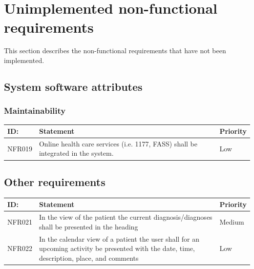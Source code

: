 \documentclass{scrreprt}
\begin{document}
\section{Unimplemented non-functional requirements}
This section describes the non-functional requirements that have not been implemented. 


\subsection{System software attributes}

\subsubsection{Maintainability}
\begin{center}
\begin{tabularx}{\linewidth}{| l | X | l |}
\hline
\textbf{ID:} & \textbf{Statement} & \textbf{Priority} \\
\hline
NFR019 & 
Online health care services (i.e. 1177, FASS) shall be integrated in the system. & 
Low \\ 
\hline
\end{tabularx}
\end{center}


\subsection{Other requirements}
\begin{center}
\begin{tabularx}{\linewidth}{| l | X | l |}
\hline
\textbf{ID:} & \textbf{Statement} & \textbf{Priority} \\
\hline
NFR021 & 
In the view of the patient the current diagnosis/diagnoses shall be presented in the heading  &
Medium \\ 
\hline
NFR022 & 
In the calendar view of a patient the user shall for an upcoming activity be presented with the date, time, description, place, and comments &
Low \\ 
\hline
\end{tabularx}
\end{center}



\end{document}
